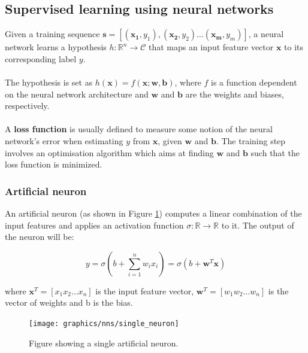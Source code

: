 	\subsection{Supervised learning using neural networks} \label{Section 2.2.2}
	Given a training sequence $\mathbf{s} = [(\mathbf{x_1}, y_1), (\mathbf{x_2}, y_2) \dots (\mathbf{x_m}, y_m)]$, a neural network learns a hypothesis $h: \mathbb{R}^n \rightarrow \mathcal{C}$ that maps an input feature vector $\mathbf{x}$ to its corresponding label $y$. 
	\\ \\
	The hypothesis is set as $h(\mathbf{x}) = f(\mathbf{x}; \mathbf{w}, \mathbf{b})$, where $f$ is a function dependent on the neural network architecture and $\mathbf{w}$ and $\mathbf{b}$ are the weights and biases, respectively. 
	\\ \\
	A \textbf{loss function} is usually defined to measure some notion of the neural network's error when estimating $y$ from $\mathbf{x}$, given $\mathbf{w}$ and $\mathbf{b}$. The training step involves an optimisation algorithm which aims at finding $\mathbf{w}$ and $\mathbf{b}$ such that the loss function is minimized. 
	
	\subsubsection{Artificial neuron}	\label{Section 2.2.2.1}
	
	
	An artificial neuron (as shown in Figure \ref{Figure 2.5}) computes a linear combination of the input features and applies an activation function $\sigma: \mathbb{R} \rightarrow \mathbb{R}$ to it.  The output of the neuron will be: 
	
	\begin{equation}
		y = \sigma(b + \sum_{i=1}^{n} w_i x_i) = \sigma(b + \mathbf{w}^T\mathbf{x})
	\end{equation}
	
	where $\mathbf{x}^T = [x_1 x_2 \dots x_n]$ is the input feature vector, $\mathbf{w}^T = [w_1 w_2 \dots w_n]$ is the vector of weights and b is the bias. 
	
	\begin{figure}[H]
		\centering

		\texttt{[image: graphics/nns/single\_neuron]}
		\caption[\textbf{Artificial neuron}]{
			Figure showing a single artificial neuron. 
		}
		\label{Figure 2.5}
	\end{figure}
	
